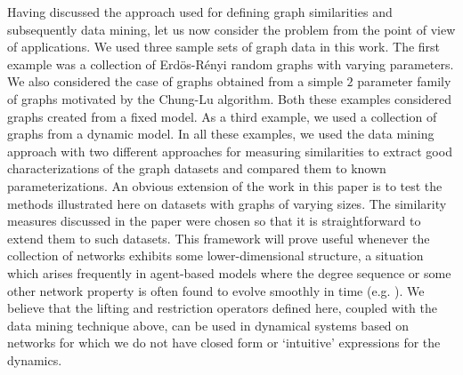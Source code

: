 Having discussed the approach used for defining graph similarities and
subsequently data mining, let us now consider the problem from the
point of view of applications.
% 
We used three sample sets of graph data in this work.
% 
The first example was a collection of Erd\"{o}s-R\'{e}nyi random
graphs with varying parameters.
% 
We also considered the case of graphs obtained from a simple $2$
parameter family of graphs motivated by the Chung-Lu algorithm.
% 
Both these examples considered graphs created from a fixed model.
% 
As a third example, we used a collection of graphs from a dynamic
model.
% 
In all these examples, we used the data mining approach with two
different approaches for measuring similarities to extract good
characterizations of the graph datasets and compared them to known
parameterizations.
% 
An obvious extension of the work in this paper is to test the methods
illustrated here on datasets with graphs of varying sizes.
% 
The similarity measures discussed in the paper were chosen so that it
is straightforward to extend them to such datasets. This framework
will prove useful whenever the collection of networks exhibits some
lower-dimensional structure, a situation which arises frequently in
agent-based models where the degree sequence or some other network
property is often found to evolve smoothly in time
(e.g. \cite{durrett_graph_2012} \cite{holiday_equation-free_2016}
\cite{bold_equation-free_2014}). We believe that the lifting and restriction
operators defined here, coupled with the data mining technique above,
can be used in dynamical systems based on networks for which we do not
have closed form or `intuitive' expressions for the dynamics.

